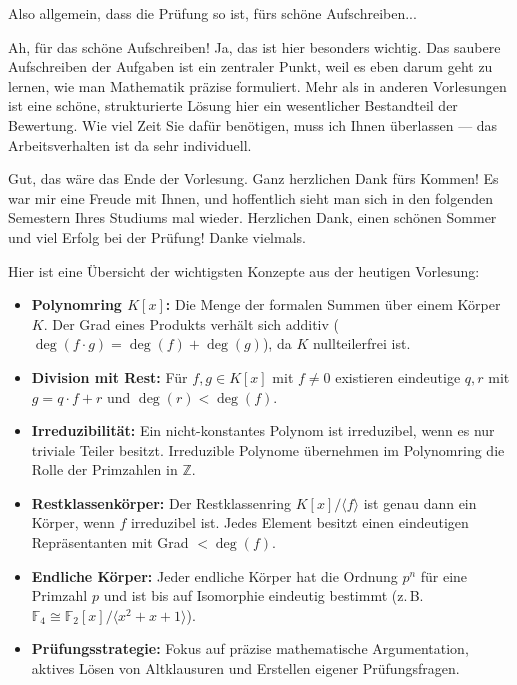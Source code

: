 \begin{student-interaction}[Studentenfrage]
Also allgemein, dass die Prüfung so ist, fürs schöne Aufschreiben...
\end{student-interaction}

\begin{spoken-clean}[01:28:29 - 01:29:21]
Ah, für das schöne Aufschreiben! Ja, das ist hier besonders wichtig. Das saubere Aufschreiben der Aufgaben ist ein zentraler Punkt, weil es eben darum geht zu lernen, wie man Mathematik präzise formuliert. Mehr als in anderen Vorlesungen ist eine schöne, strukturierte Lösung hier ein wesentlicher Bestandteil der Bewertung. Wie viel Zeit Sie dafür benötigen, muss ich Ihnen überlassen --- das Arbeitsverhalten ist da sehr individuell.

Gut, das wäre das Ende der Vorlesung. Ganz herzlichen Dank fürs Kommen! Es war mir eine Freude mit Ihnen, und hoffentlich sieht man sich in den folgenden Semestern Ihres Studiums mal wieder. Herzlichen Dank, einen schönen Sommer und viel Erfolg bei der Prüfung! Danke vielmals.
\end{spoken-clean}

\begin{nice-box}
Hier ist eine Übersicht der wichtigsten Konzepte aus der heutigen Vorlesung:
\begin{itemize}
    \item \textbf{Polynomring $K[x]$:} Die Menge der formalen Summen über einem Körper $K$. Der Grad eines Produkts verhält sich additiv ($\deg(f \cdot g) = \deg(f) + \deg(g)$), da $K$ nullteilerfrei ist.
    \item \textbf{Division mit Rest:} Für $f, g \in K[x]$ mit $f \neq 0$ existieren eindeutige $q, r$ mit $g = q \cdot f + r$ und $\deg(r) < \deg(f)$.
    \item \textbf{Irreduzibilität:} Ein nicht-konstantes Polynom ist irreduzibel, wenn es nur triviale Teiler besitzt. Irreduzible Polynome übernehmen im Polynomring die Rolle der Primzahlen in $\mathbb{Z}$.
    \item \textbf{Restklassenkörper:} Der Restklassenring $K[x]/\langle f \rangle$ ist genau dann ein Körper, wenn $f$ irreduzibel ist. Jedes Element besitzt einen eindeutigen Repräsentanten mit Grad $< \deg(f)$.
    \item \textbf{Endliche Körper:} Jeder endliche Körper hat die Ordnung $p^n$ für eine Primzahl $p$ und ist bis auf Isomorphie eindeutig bestimmt (z.\,B. $\mathbb{F}_4 \cong \mathbb{F}_2[x]/\langle x^2+x+1\rangle$).
    \item \textbf{Prüfungsstrategie:} Fokus auf präzise mathematische Argumentation, aktives Lösen von Altklausuren und Erstellen eigener Prüfungsfragen.
\end{itemize}
\end{nice-box}

